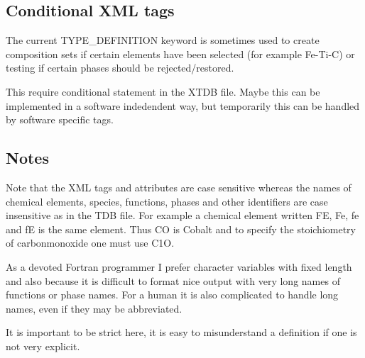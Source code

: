 \documentclass{article}
\begin{document}
\subsection{Conditional XML tags}

The current TYPE\_DEFINITION keyword is sometimes used to create
composition sets if certain elements have been selected (for example
Fe-Ti-C) or testing if certain phases should be rejected/restored.

This require conditional statement in the XTDB file.  Maybe this can
be implemented in a software indedendent way, but temporarily this can
be handled by software specific tags.

\newpage 

\subsection{Notes}\label{sec:notes}

Note that the XML tags and attributes are case sensitive whereas the
names of chemical elements, species, functions, phases and other
identifiers are case insensitive as in the TDB file.  For example a
chemical element written FE, Fe, fe and fE is the same element.  Thus
CO is Cobalt and to specify the stoichiometry of carbonmonoxide one
must use C1O.

As a devoted Fortran programmer I prefer character variables with
fixed length and also because it is difficult to format nice output
with very long names of functions or phase names.  For a human it is
also complicated to handle long names, even if they may be
abbreviated.

It is important to be strict here, it is easy to misunderstand a
definition if one is not very explicit.
\end{document}
